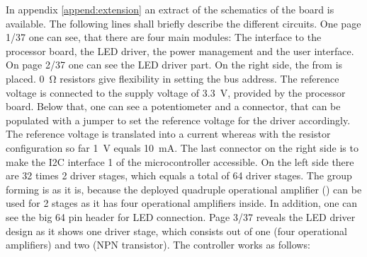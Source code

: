 In appendix \ref{append:extension} an extract of the schematics of the board is available. The following lines shall briefly describe the different circuits. One page 1/37 one can see, that there are four main modules: The interface to the processor board, the \gls{LED} driver, the power management and  the user interface. 
\newpar 
On page 2/37 one can see the \gls{LED} driver part. On the right side, the  from  is placed. \SI{0}{\ohm} resistors give flexibility in setting the bus address. The reference voltage is connected to the supply voltage of \SI{3.3}{\volt}, provided by the processor board. Below that, one can see a potentiometer and a connector, that can be populated with a jumper to set the reference voltage for the driver accordingly. The reference voltage is translated into a current whereas with the resistor configuration so far \SI{1}{\volt} equals \SI{10}{\milli\ampere}. The last connector on the right side is to make the \gls{I2C} interface 1 of the microcontroller accessible.
On the left side there are 32 times 2 driver stages, which equals a total of 64 driver stages. The group forming is as it is, because the deployed quadruple operational amplifier () can be used for 2 stages as it has four operational amplifiers inside. In addition, one can see the big 64 pin header for \gls{LED} connection. 
\newpar 
Page 3/37 reveals the \gls{LED} driver design as it shows one driver stage, which consists out of one  (four operational amplifiers) and two  (NPN transistor). The controller works as follows: 
